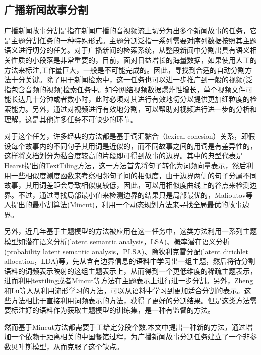 \subsection{广播新闻故事分割}
广播新闻故事分割是指在新闻广播的音视频流上切分为出多个新闻故事的任务\cite{hauptmann1998story,JA:02}，它是主题分割任务的一种特殊形式。主题分割泛指一系列需要对序列数据按照其主题语义进行切分的任务。对于广播新闻的检索系统，从整段新闻中分割出具有语义相关性质的小段落是非常重要的，目前，面对日益增长的海量数据，如果使用人工的方法来标注,工作量巨大，一般是不可能完成的。因此，寻找到合适的自动分割方法十分关键。除了用于新闻检索中，这一任务也可以进一步推广到一般的视频(泛指包含音频的视频)检索任务中。如今网络视频数据爆炸性增长，单个视频文件可能长达几十分钟或者数小时，此时必须对其进行有效地切分以提供更加细粒度的检索能力。另外，通过对视频进行有效地分割，可以帮助对视频进行进一步的分析和理解，这是其他许多任务不可缺少的环节。

对于这个任务，许多经典的方法都是基于词汇黏合（lexical cohesion）关系，即假设每个故事内的不同句子其用词是近似的，而不同故事之间的用词是有差异性的，这样将文档划分为黏合度较高的片段即可得到故事的边界。其中的典型代表是Hearst提出的TextTiling方法\cite{HEA:97,BANE:06,Wang:10}，这一方法首先将句子转化为词频向量表示，然后利用一些相似度测度函数来考察相邻句子间的相似度，由于边界两侧的句子分属不同故事，其用词差距会导致相似度较低，因此，可以用相似度曲线上的谷点来检测边界。不过，通过寻找局部最小值来检测边界的结果只是局部最优的，Malioutov等人提出的最小割算法(Mincut)\cite{MAL:06}，利用一个动态规划方法来寻找全局最优的故事边界。

另外，近几年基于主题模型的方法被应用在这一任务中，这类方法利用一系列主题模型如潜在语义分析(latent semantic analysis，LSA)、概率潜在语义分析(probability latent semantic analysis，PLSA)、隐狄利克雷分配(latent dirichlet allocation，LDA)等\cite{hofmann1999probabilistic,blei2003latent}，先从含有边界信息的语料中学习出一组主题，然后将待分割语料的词频表示映射的这组主题表示上，从而得到一个更低维度的稀疏主题表示，进而利用textiling或者Mincut等方法在主题表示上进行进一步分割\cite{CHOI:01,HAL:08,CHI:12,LU:2011}。另外，Zheng和Lu等人从利用流形学习的方法，可以从语料中学习到更加适合分割的表示\cite{lu2013broadcast,xie2012laplacian}。这些方法相比于直接利用词频表示的方法，获得了更好的分割结果。但是这类方法需要标注好的语料作为获取主题模型的训练集，是一种有监督的方法。

然而基于Mincut方法都需要手工给定分段个数,本文中提出一种新的方法，通过增加一个依赖于距离相关的中国餐馆过程，为广播新闻故事分割任务建立了一个非参数贝叶斯模型，从而克服了这个缺点。

